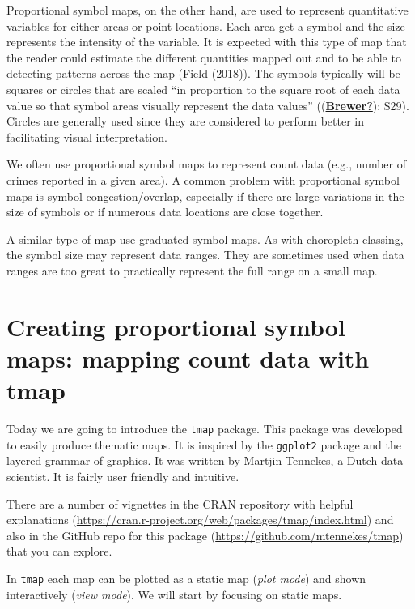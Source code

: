 \documentclass[
]{book}
\begin{document}
Proportional symbol maps, on the other hand, are used to represent quantitative variables for either areas or point locations. Each area get a symbol and the size represents the intensity of the variable. It is expected with this type of map that the reader could estimate the different quantities mapped out and to be able to detecting patterns across the map (\protect\hyperlink{ref-Field_2018}{Field} (\protect\hyperlink{ref-Field_2018}{2018})). The symbols typically will be squares or circles that are scaled ``in proportion to the square root of each data value so that symbol areas visually represent the data values'' ((\protect\hyperlink{ref-Brewer}{\textbf{Brewer?}}): S29). Circles are generally used since they are considered to perform better in facilitating visual interpretation.

We often use proportional symbol maps to represent count data (e.g., number of crimes reported in a given area). A common problem with proportional symbol maps is symbol congestion/overlap, especially if there are large variations in the size of symbols or if numerous data locations are close together.

A similar type of map use graduated symbol maps. As with choropleth classing, the symbol size may represent data ranges. They are sometimes used when data ranges are too great to practically represent the full range on a small map.

\hypertarget{creating-proportional-symbol-maps-mapping-count-data-with-tmap}{%
\section{Creating proportional symbol maps: mapping count data with tmap}\label{creating-proportional-symbol-maps-mapping-count-data-with-tmap}}

Today we are going to introduce the \texttt{tmap} package. This package was developed to easily produce thematic maps. It is inspired by the \texttt{ggplot2} package and the layered grammar of graphics. It was written by Martjin Tennekes, a Dutch data scientist. It is fairly user friendly and intuitive.

There are a number of vignettes in the CRAN repository with helpful explanations (\url{https://cran.r-project.org/web/packages/tmap/index.html}) and also in the GitHub repo for this package (\url{https://github.com/mtennekes/tmap}) that you can explore.

In \texttt{tmap} each map can be plotted as a static map (\emph{plot mode}) and shown interactively (\emph{view mode}). We will start by focusing on static maps.
\end{document}
